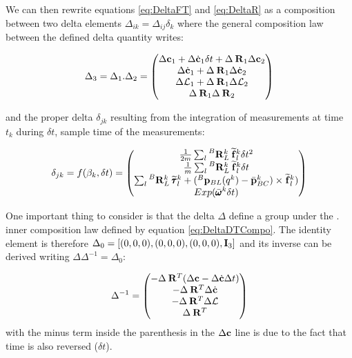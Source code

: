 \documentclass[11pt]{article}
\newcommand{\Rot}[2]{\prescript{#1}{}{\bfR}_{#2}}
\newcommand{\posi}[2]{\prescript{#1}{}{\bfp}_{#2}}
\newcommand{\posibar}{\bar{\bfp}}
\newcommand{\angvelbar}{\bar{\pmb{\omega}}}
\newcommand{\forcem}[2]{\prescript{#1}{}{\widetilde{\bff}}_{#2}}
\newcommand{\torquem}[2]{\prescript{#1}{}{\widetilde{\pmb{\tau}}}_{#2}}
\newcommand{\AM}{\mathcal{L}}
\newcommand{\COM}{\bfc}
\newcommand{\COMd}{\dot{\bfc}}
\newcommand{\Ident}{\bfI}
\begin{document}
We can then rewrite equations  \ref{eq:DeltaFT} and \ref{eq:DeltaR} as a composition between two delta elements $\Delta_{ik} = \Delta_{ij} \delta_k$ where the general composition law between the defined delta quantity writes:

\begin{equation}
    \Delta_3 = \Delta_1 . \Delta_2 = 
    \begin{pmatrix}
    \Delta \COM_1 + \Delta \COMd_1 \delta t + \Delta \Rot{}{1}  \Delta \COM_2
    \\
    \Delta \COMd_1 + \Delta \Rot{}{1}  \Delta \COMd_2
    \\
    \Delta \AM_1 + \Delta \Rot{}{1}  \Delta \AM_2
    \\
    \Delta \Rot{}{1}\Delta \Rot{}{2}
    \end{pmatrix}
    \label{eq:DeltaDTCompo}
\end{equation}

and the proper delta $\delta_{jk}$ resulting from the integration of measurements at time $t_k$ during $\delta t$, sample time of the measurements:

\begin{equation}
    \delta_{jk} =
    f(\beta_k, \delta t) =
    \begin{pmatrix}
    \frac{1}{2m} \sum_l \Rot{B}{L}^{k} \forcem{}{l}^{k} \delta t^2
    \\
    \frac{1}{m} \sum_l \Rot{B}{L}^{k} \forcem{}{l}^{k} \delta t 
    \\
    \sum_l \Rot{B}{L}^{k} \torquem{}{l}^{k} +  (\posi{B}{BL}(q^k) - \posibar_{BC}^k) \times \forcem{}{l}^{k})
    \\
    Exp(\angvelbar^k\delta t)
    \end{pmatrix}
\end{equation}

One important thing to consider is that the delta $\Delta$ define a group under the $.$ inner composition law defined by equation \ref{eq:DeltaDTCompo}. The identity element is therefore $\Delta_0 = \left[ (0,0,0), (0,0,0), (0,0,0), \Ident_3 \right]$ and its inverse can be derived writing $\Delta \Delta^{-1} = \Delta_0$:

\begin{equation}
	\Delta^{-1} =
	\begin{pmatrix}
	 - \Delta \Rot{}{}^T (\Delta\COM - \Delta\COMd \Delta t)
	 \\
	 - \Delta \Rot{}{}^T \Delta \COMd
	 \\
	 - \Delta \Rot{}{}^T \Delta\AM
	 \\
	 \Delta \Rot{}{}^T
	\end{pmatrix}
\end{equation}
with the minus term inside the parenthesis in the $\Delta\COM$ line is due to the fact that time is also reversed ($\delta t$).
\end{document}
